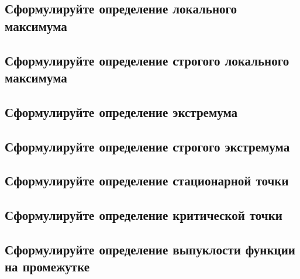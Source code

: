 \subsection{ Сформулируйте определение локального максимума}
\begin{definition}

\end{definition}

\subsection{ Сформулируйте определение строгого локального максимума}
\begin{definition}

\end{definition}

\subsection{ Сформулируйте определение экстремума}
\begin{definition}

\end{definition}

\subsection{ Сформулируйте определение строгого экстремума}
\begin{definition}

\end{definition}

\subsection{ Сформулируйте определение стационарной точки}
\begin{definition}

\end{definition}

\subsection{ Сформулируйте определение критической точки}
\begin{definition}

\end{definition}

\subsection{ Сформулируйте определение выпуклости функции на промежутке}
\begin{definition}

\end{definition}

